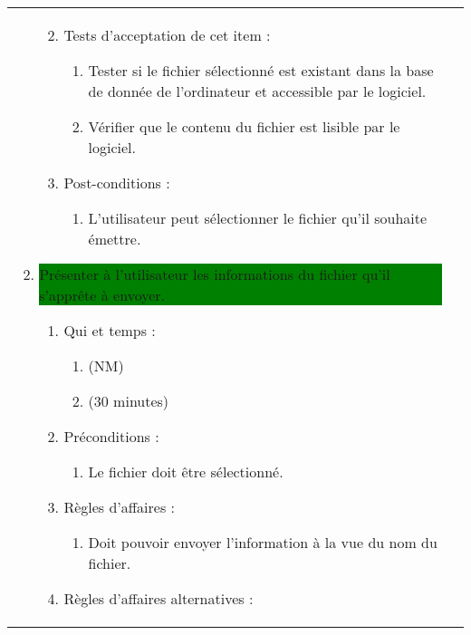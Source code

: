 \begin{longtable}{|l|p{}|}
\begin{enumerate}[label*=\arabic*.]
\begin{enumerate}[label*=\arabic*.]
\begin{enumerate}[label*=\arabic*.]
                    \end{enumerate}
                    \item Tests d'acceptation de cet item :
                    \begin{enumerate}[label*=\arabic*.]
                        \item Tester si le fichier sélectionné est existant dans la base de donnée de l'ordinateur et accessible par le logiciel.
                        \item Vérifier que le contenu du fichier est lisible par le logiciel.
                    \end{enumerate}
                    \item Post-conditions :
                    \begin{enumerate}[label*=\arabic*.]
                        \item L'utilisateur peut sélectionner le fichier qu'il souhaite émettre.
                    \end{enumerate}
                \end{enumerate}
            \item \colorbox{Green}{\parbox{13cm}{Présenter à l’utilisateur les informations du fichier qu’il s’apprête à envoyer.}}
                \begin{enumerate}[label*=\arabic*.]
                    \item Qui et temps :
                    \begin{enumerate}[label*=\arabic*.]
                        \item (NM)
                        \item (30 minutes)
                    \end{enumerate}
                    \item Préconditions : 
                    \begin{enumerate}[label*=\arabic*.]
                        \item Le fichier doit être sélectionné.
                    \end{enumerate}
                    \item Règles d’affaires :
                    \begin{enumerate}[label*=\arabic*.]
                        \item Doit pouvoir envoyer l'information à la vue du nom du fichier.
                    \end{enumerate}
                    \item Règles d’affaires alternatives :

\end{enumerate}
\end{enumerate}
\end{longtable}
